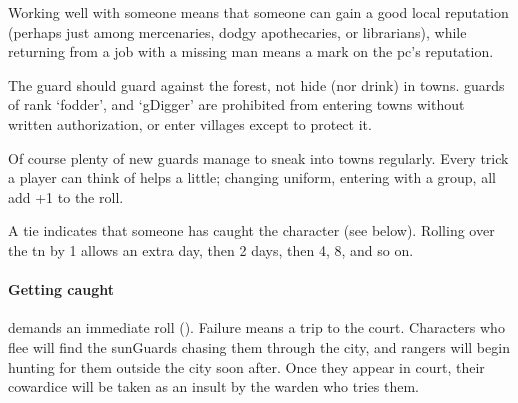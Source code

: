 \begin{multicols}{2}
Working well with someone means that someone can gain a good local reputation (perhaps just among mercenaries, dodgy apothecaries, or librarians), while returning from a job with a missing man means a mark on the \gls{pc}'s reputation.

The \gls{guard} should guard against the forest, not hide (nor drink) in towns.
\Glspl{guard} of rank `\gls{fodder}', and `\gls{gDigger}' are prohibited from entering towns without written authorization, or enter \glspl{village} except to protect it.


Of course plenty of new \glspl{guard} manage to sneak into towns regularly.
Every trick a player can think of helps a little; changing uniform, entering with a group, all add +1 to the roll.

A tie indicates that someone has caught the character (see below).
Rolling over the \gls{tn} by 1 allows an extra day, then 2 days, then 4, 8, and so on.

\paragraph{Getting caught}
demands an immediate  roll (\tn[10]).
Failure means a trip to the \gls{court}.
Characters who flee will find the \glspl{sunGuard} chasing them through the city, and \glspl{ranger} will begin hunting for them outside the city soon after.
Once they appear in \gls{court}, their cowardice will be taken as an insult by the \gls{warden} who tries them.%

\end{multicols}


